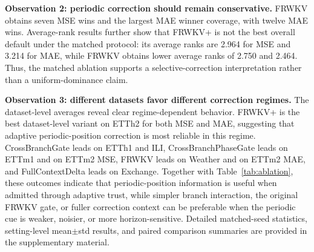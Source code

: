 \documentclass[a4paper,fleqn]{cas-sc}
\begin{document}
\textbf{Observation 2: periodic correction should remain conservative.}
FRWKV obtains seven MSE wins and the largest MAE winner coverage, with twelve MAE wins. Average-rank results further show that FRWKV+ is not the best overall default under the matched protocol: its average ranks are 2.964 for MSE and 3.214 for MAE, while FRWKV obtains lower average ranks of 2.750 and 2.464. Thus, the matched ablation supports a selective-correction interpretation rather than a uniform-dominance claim.

\textbf{Observation 3: different datasets favor different correction regimes.}
The dataset-level averages reveal clear regime-dependent behavior. FRWKV+ is the best dataset-level variant on ETTh2 for both MSE and MAE, suggesting that adaptive periodic-position correction is most reliable in this regime. CrossBranchGate leads on ETTh1 and ILI, CrossBranchPhaseGate leads on ETTm1 and on ETTm2 MSE, FRWKV leads on Weather and on ETTm2 MAE, and FullContextDelta leads on Exchange. Together with Table~\ref{tab:ablation}, these outcomes indicate that periodic-position information is useful when admitted through adaptive trust, while simpler branch interaction, the original FRWKV gate, or fuller correction context can be preferable when the periodic cue is weaker, noisier, or more horizon-sensitive. Detailed matched-seed statistics, setting-level mean$\pm$std results, and paired comparison summaries are provided in the supplementary material.
\end{document}
